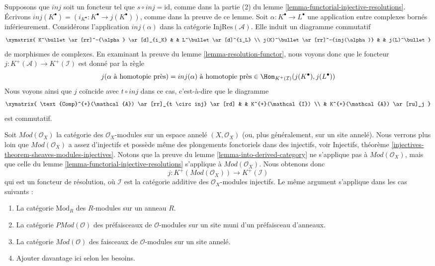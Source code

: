 \begin{remark}
\label{remark-match}
Supposons que $inj$ soit un foncteur tel que $s \circ inj = \text{id}$, comme
dans la partie (2) du lemme
\ref{lemma-functorial-injective-resolutions}.
Écrivons
$inj(K^\bullet) = (i_{K^\bullet} : K^\bullet \to j(K^\bullet))$, comme dans
la preuve de ce lemme.
Soit $\alpha : K^\bullet \to L^\bullet$ une application entre complexes bornés
inférieurement. Considérons l'application $inj(\alpha)$ dans la catégorie
$\text{InjRes}(\mathcal{A})$. Elle induit un diagramme commutatif
$$
\xymatrix{
K^\bullet
\ar[rr]^-{\alpha}
\ar[d]_{i_K} & &
L^\bullet \ar[d]^{i_L} \\
j(K)^\bullet
\ar[rr]^-{inj(\alpha)}
& &
j(L)^\bullet
}
$$
de morphismes de complexes.
En examinant la preuve du lemme \ref{lemma-resolution-functor}, nous voyons
donc que le foncteur
$j : K^{+}(\mathcal{A}) \to K^{+}(\mathcal{I})$ est donné par la règle
$$
j(\alpha\text{ à homotopie près}) =
inj(\alpha)\text{ à homotopie près}\in
\Hom_{K^{+}(\mathcal{I})}(j(K^\bullet), j(L^\bullet))
$$
Nous voyons ainsi que $j$ coïncide avec $t \circ inj$ dans ce cas,
c'est-à-dire que le diagramme
$$
\xymatrix{
\text{Comp}^{+}(\mathcal{A}) \ar[rr]_{t \circ inj} \ar[rd] & &
K^{+}(\mathcal{I}) \\
& K^{+}(\mathcal{A}) \ar[ru]_j
}
$$
est commutatif.
\end{remark}

\begin{remark}
\label{remark-big-abelian-category}
Soit $\textit{Mod}(\mathcal{O}_X)$ la catégorie des
$\mathcal{O}_X$-modules sur un espace annelé $(X, \mathcal{O}_X)$ (ou, plus
généralement, sur un site annelé). Nous verrons plus loin que
$\textit{Mod}(\mathcal{O}_X)$ a assez d'injectifs et possède même des
plongements fonctoriels dans des injectifs, voir Injectifs, théorème
\ref{injectives-theorem-sheaves-modules-injectives}.
Notons que la preuve du lemme \ref{lemma-into-derived-category} ne s'applique
pas à $\textit{Mod}(\mathcal{O}_X)$, mais que celle du
lemme \ref{lemma-functorial-injective-resolutions} s'applique à
$\textit{Mod}(\mathcal{O}_X)$. Nous obtenons donc
$$
j : K^{+}(\textit{Mod}(\mathcal{O}_X))
\longrightarrow
K^{+}(\mathcal{I})
$$
qui est un foncteur de résolution, où $\mathcal{I}$ est la catégorie additive
des $\mathcal{O}_X$-modules injectifs. Le même argument s'applique dans les cas
suivants :
\begin{enumerate}
\item La catégorie $\text{Mod}_R$ des $R$-modules sur un anneau $R$.
\item La catégorie $\textit{PMod}(\mathcal{O})$ des préfaisceaux de
$\mathcal{O}$-modules sur un site muni d'un préfaisceau d'anneaux.
\item La catégorie $\textit{Mod}(\mathcal{O})$ des faisceaux de
$\mathcal{O}$-modules sur un site annelé.
\item Ajouter davantage ici selon les besoins.
\end{enumerate}
\end{remark}


